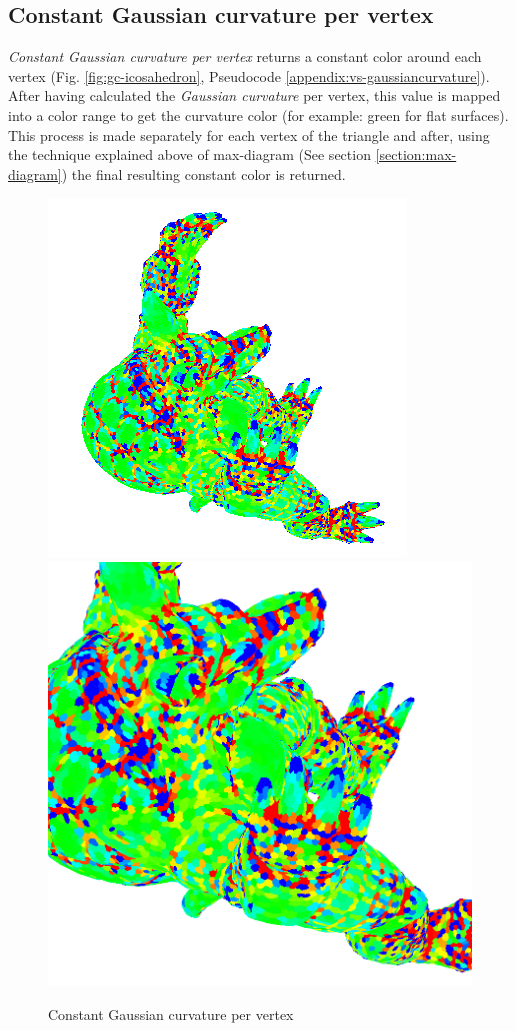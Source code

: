 \subsection{Constant Gaussian curvature per vertex}
\textit{Constant Gaussian curvature per vertex} returns a constant color around each vertex (Fig. \ref{fig:gc-icosahedron}, Pseudocode \ref{appendix:vs-gaussiancurvature}). After having calculated the \textit{Gaussian curvature} per vertex, this value is mapped into a color range to get the curvature color (for example: green for flat surfaces). This process is made separately for each vertex of the triangle and after, using the technique explained above of max-diagram (See section \ref{section:max-diagram}) the final resulting constant color is returned.
\begin{figure}[!h]
    \centering
    \centering
    \includegraphics[scale=1.0]{images/gc-armadillo-top.png}
    \endminipage\hfill
    \centering
    \includegraphics[scale=0.4]{images/gc-detail-armadillo-top.png}
    \endminipage
    \caption{Constant Gaussian curvature per vertex} \label{fig:gc-detail}
\end{figure}


